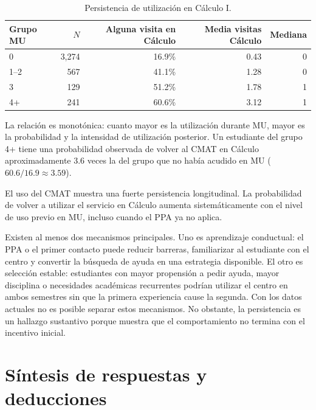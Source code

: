 \documentclass[11pt,letterpaper]{article}
\begin{document}
\begin{table}[H]
\centering
\caption{Persistencia de utilización en Cálculo I.}
\label{tab:persistence}
\begin{tabular}{@{}lrrrr@{}}
\toprule
\textbf{Grupo MU} & \textbf{$N$} & \textbf{Alguna visita en Cálculo} & \textbf{Media visitas Cálculo} & \textbf{Mediana} \\
\midrule
0 & 3,274 & 16.9\% & 0.43 & 0 \\
1--2 & 567 & 41.1\% & 1.28 & 0 \\
3 & 129 & 51.2\% & 1.78 & 1 \\
4+ & 241 & 60.6\% & 3.12 & 1 \\
\bottomrule
\end{tabular}
\end{table}

La relación es monotónica: cuanto mayor es la utilización durante MU, mayor es la probabilidad y la intensidad de utilización posterior. Un estudiante del grupo 4+ tiene una probabilidad observada de volver al CMAT en Cálculo aproximadamente 3.6 veces la del grupo que no había acudido en MU ($60.6/16.9\approx3.59$).

\begin{answerbox}
El uso del CMAT muestra una fuerte persistencia longitudinal. La probabilidad de volver a utilizar el servicio en Cálculo aumenta sistemáticamente con el nivel de uso previo en MU, incluso cuando el PPA ya no aplica.
\end{answerbox}

\begin{interpretbox}
Existen al menos dos mecanismos principales. Uno es aprendizaje conductual: el PPA o el primer contacto puede reducir barreras, familiarizar al estudiante con el centro y convertir la búsqueda de ayuda en una estrategia disponible. El otro es selección estable: estudiantes con mayor propensión a pedir ayuda, mayor disciplina o necesidades académicas recurrentes podrían utilizar el centro en ambos semestres sin que la primera experiencia cause la segunda. Con los datos actuales no es posible separar estos mecanismos. No obstante, la persistencia es un hallazgo sustantivo porque muestra que el comportamiento no termina con el incentivo inicial.
\end{interpretbox}

\section{Síntesis de respuestas y deducciones}
\end{document}
